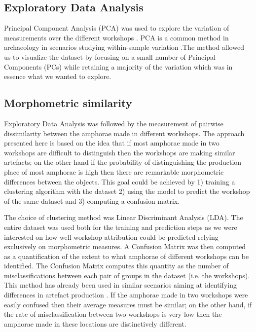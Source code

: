 \documentclass[review]{elsarticle}
\begin{document}
\subsection{Exploratory Data Analysis}

Principal Component Analysis (PCA) was used to explore the variation of measurements over the different workshops \citep{jolliffe_principal_2002} . PCA is a common method in archaeology in scenarios studying within-sample variation \citep{ shennan_quantifying_1997, li_crossbows_2014, schillinger_differences_2016}.The method allowed us to visualize the dataset by focusing on a small number of Principal Components (PCs) while retaining a majority of the variation which was in essence what we wanted to explore. 

\subsection{Morphometric similarity} 

Exploratory Data Analysis was followed by the measurement of pairwise dissimilarity between the amphorae made in different workshops. The approach presented here is based on the idea that if most amphorae made in two workshops are difficult to distinguish then the workshops are making similar artefacts; on the other hand if the probability of distinguishing the production place of most amphorae is high then there are remarkable morphometric differences between the objects. This goal could be achieved by 1) training a clustering algorithm with the dataset 2) using the model to predict the workshop of the same dataset and 3) computing a confusion matrix.

The choice of clustering method was Linear Discriminant Analysis (LDA). The entire dataset was used both for the training and prediction steps as we were interested on how well workshop attribution could be predicted relying exclusively on morphometric measures. A Confusion Matrix was then computed as a quantification of the extent to what amphorae of different workshops can be identified. The Confusion Matrix computes this quantity as the number of misclassifications between each pair of groups in the dataset (i.e. the workshops). This method has already been used in similar scenarios aiming at identifying differences in artefact production \citep{thorpe_distribution_1984,i_martin_alisis_1998,charlton_investigating_2012}. If the amphorae made in two workshops were easily confused then their average measures must be similar; on the other hand, if the rate of misclassification between two workshops is very low then the amphorae made in these locations are distinctively different.
\end{document}
